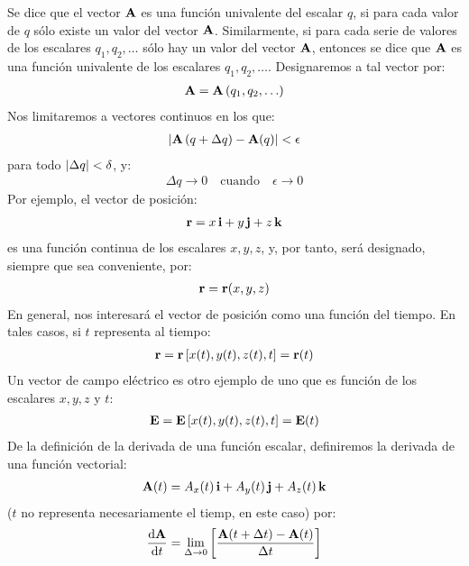 \documentclass[12pt]{article}
\begin{document}
Se dice que el vector $\vb{A}$ es una función univalente del escalar $q$, si para cada valor de $q$ sólo existe un valor del vector $\vb{A}$. Similarmente, si para cada serie de valores de los escalares $q_{1}, q_{2}, \ldots$ sólo hay un valor del vector $\vb{A}$, entonces se dice que $\vb{A}$ es una función univalente de los escalares $q_{1}, q_{2}, \ldots$. Designaremos a tal vector por:
\begin{align*}
    \vb{A} = \vb{A} \left( q_{1}, q_{2}, \ldots \right)
\end{align*}
Nos limitaremos a vectores continuos en los que:
\begin{align*}
    \abs{\vb{A} \left( q + \Delta q \right) - \vb{A} (q)} < \epsilon 
\end{align*}
para todo $\abs{\Delta q} < \delta$, y:
\begin{align*}
     \Delta q \rightarrow 0 \quad \text{cuando} \quad \epsilon \rightarrow 0
\end{align*}
Por ejemplo, el vector de posición:
\begin{align*}
    \vb{r} = x \, \vb{i} + y \, \vb{j} + z \, \vb{k} 
\end{align*}
es una función continua de los escalares $x, y, z$, y, por tanto, será designado, siempre que sea conveniente, por:
\begin{align*}
    \vb{r} = \vb{r} (x, y, z) 
\end{align*}
En general, nos interesará el vector de posición como una función del tiempo. En tales casos, si $t$ representa al tiempo:
\begin{align*}
    \vb{r} = \vb{r} \left[ x (t), y(t), z(t), t \right] = \vb{r}(t)
\end{align*} 
Un vector de campo eléctrico es otro ejemplo de uno que es función de los escalares $x, y, z$ y $t$:
\begin{align*}
    \vb{E} = \vb{E} \left[ x (t), y(t), z(t), t \right] = \vb{E} (t)
\end{align*}
De la definición de la derivada de una función escalar, definiremos la derivada de una función vectorial:
\begin{align*}
    \vb{A} (t) = A_{x} (t) \, \vb{i} + A_{y} (t) \, \vb{j} + A_{z} (t) \, \vb{k}
\end{align*}
($t$ no representa necesariamente el tiemp, en este caso) por:
\begin{align}
    \dv{\vb{A}}{t} = \lim_{\Delta \to 0} \left[ \dfrac{\vb{A} (t + \Delta t) - \vb{A} (t)}{\Delta t} \right]
    \label{eq:ecuacion_01_56}
\end{align}
\end{document}

